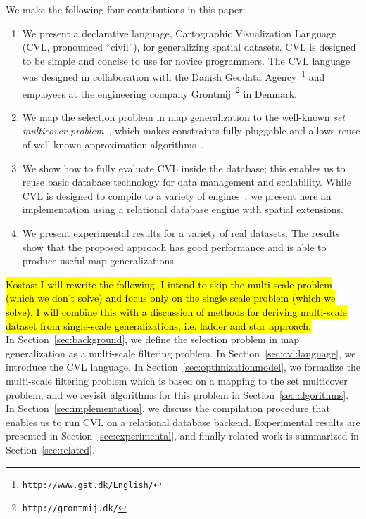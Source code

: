 We make the following four contributions in this paper:
\begin{enumerate}
\item We present a declarative language, Cartographic Visualization Language (CVL, pronounced ``civil''), for generalizing spatial datasets. CVL is designed to be simple and concise to use for novice programmers. The CVL language was designed in collaboration with the Danish Geodata Agency~\footnote{\texttt{http://www.gst.dk/English/}} and employees at the engineering company Grontmij~\footnote{\texttt{http://grontmij.dk/}} in Denmark.

\item We map the selection problem in map generalization to the well-known \emph{set multicover problem}~\cite{rajagopalan1998primal}, which makes constraints fully pluggable and allows reuse of well-known approximation algorithms~\cite{rajagopalan1998primal,vazirani2001approximation}.

\item We show how to fully evaluate CVL inside the database; this enables us to reuse basic database technology for data management and scalability. While CVL is designed to compile to a variety of engines~\cite{Stonebraker:2010:PDBMSvsMapReduce}, we present here an implementation using a relational database engine with spatial extensions.

\item We present experimental results for a variety of real datasets. The results show that the proposed approach has good performance and is able to produce useful map generalizations.
\end{enumerate}

\hl{Kostas: I will rewrite the following. I intend to skip the multi-scale problem (which we don't solve) and focus only on the single scale problem (which we solve). I will combine this with a discussion of methods for deriving multi-scale dataset from single-scale generalizations, i.e. ladder and star approach.}\\

In Section~\ref{sec:background}, we define the selection problem in map generalization as a multi-scale filtering problem. In Section~\ref{sec:cvl:language}, we introduce the CVL language. In Section~\ref{sec:optimizationmodel}, we formalize the multi-scale filtering problem which is based on a mapping to the set multicover problem, and we revisit algorithms for this problem in Section~\ref{sec:algorithms}. In Section~\ref{sec:implementation}, we discuss the compilation procedure that enables us to run CVL on a relational database backend. Experimental results are presented in Section~\ref{sec:experimental}, and finally related work is summarized in Section~\ref{sec:related}.
